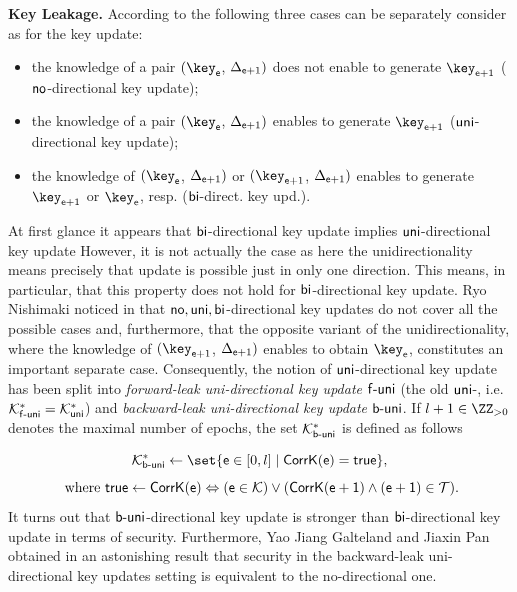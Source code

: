 \documentclass{fundam}
\begin{document}
\vspace{0.1cm}
\noindent\textbf{Key Leakage.} According to \cite{jiang2020} the following three cases can be separately consider as for the key update:
\begin{itemize}
\item  the knowledge of a pair $(\key_{\epoch}$, $\Delta_{\mathsf{e}+1})$ does not enable to generate $\key_{\epoch+1}$ ($\mathsf{no}$-directional key update);
\item the knowledge of a pair $(\key_{\epoch}$, $\Delta_{\mathsf{e}+1})$ enables to generate $\key_{\epoch+1}$ ($\mathsf{uni}$-directional key update);
\item the knowledge of $(\key_{\epoch}$, $\Delta_{\mathsf{e}+1})$ or $(\key_{\epoch+1}$, $\Delta_{\mathsf{e}+1})$ enables to generate $\key_{\epoch+1}$ or $\key_{\epoch}$, resp. ($\mathsf{bi}$-direct. key upd.).
\end{itemize}


At first glance it appears that $\mathsf{bi}$-directional key update implies $\mathsf{uni}$-directional key update However, it is not actually the case as here the unidirectionality means precisely that update is possible just in only one direction. This means, in particular, that this property does not hold for $\mathsf{bi}$-directional key update.  
Ryo Nishimaki noticed in \cite{nishimaki2022direction} that $\mathsf{no}, \mathsf{uni}, \mathsf{bi}$-directional key updates do not cover all the possible cases and, furthermore, that the opposite variant of the unidirectionality, where  the knowledge of $(\key_{\epoch+1}$, $\Delta_{\mathsf{e}+1})$ enables to obtain $\key_{\epoch}$, constitutes an important separate case. %
Consequently, the notion of $\mathsf{uni}$-directional key update has been split into \textit{forward-leak uni-directional key update} $\mathsf{f}{\text{-}}\mathsf{uni}$ (the old $\mathsf{uni}$-, i.e. $\mathcal{K}_{\mathsf{f}{\text{-}}\mathsf{uni}}^{*}=\mathcal{K}_{\mathsf{uni}}^{*}$) and \textit{backward-leak uni-directional key update} $\mathsf{b}{\text{-}}\mathsf{uni}$. 
If $l+1\in \ZZ_{>0}$ denotes the maximal number of epochs, the set $\mathcal{K}_{\mathsf{b}{\text{-}}\mathsf{uni}}^{*}$ is defined as follows


$$\Set{K}_{\opuni}^{*}\gets \set{\epoch\in [0,l]\mid \tx{CorrK}(\epoch)=\tx{true}},$$ $$ \text{ where } \mathsf{true}\gets\mathsf{CorrK}(\mathsf{e})\Leftrightarrow (\mathsf{e} \in\mathcal{K}) \lor (\mathsf{CorrK(\mathsf{e} +1 )\land (\mathsf{e} +1 )\in \mathcal{T}}).$$
It turns out that $\mathsf{b}{\text{-}}\mathsf{uni}$-directional key update is stronger than $\mathsf{bi}$-directional key update in terms of security. Furthermore, Yao Jiang Galteland and Jiaxin Pan obtained in \cite{jiang2023backward} an astonishing result that security in the backward-leak uni-directional key updates setting is equivalent to the no-directional one.
\end{document}
